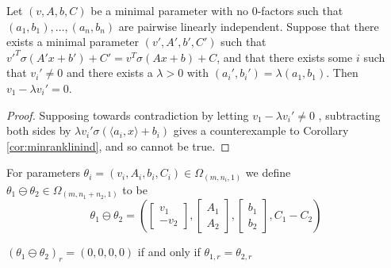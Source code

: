 \documentclass[11pt,letterpaper]{amsart}
\begin{document}
\begin{corollary}\label{cor:semidependenttermscancelling}
    Let $(v, A, b, C)$ be a minimal parameter with no 0-factors such that $(a_1, b_1), \ldots, (a_n, b_n)$ are pairwise linearly independent. Suppose that there exists a minimal parameter $(v', A', b', C')$ such that $v'^T\sigma (A' x + b')+C' = v^T\sigma (Ax + b) + C$, and that there exists some $i$ such that $v_i'\neq 0$ and there exists a $\lambda>0$ with $(a_i', b_i')=\lambda (a_1, b_1)$. Then $v_1-\lambda v_i'=0$. 
\end{corollary}
\begin{proof}
    Supposing towards contradiction by letting $v_1-\lambda v_i'\neq 0$ , subtracting both sides by $\lambda v_i'\sigma(\langle a_i, x\rangle + b_i)$ gives a counterexample to Corollary \ref{cor:minranklinind}, and so cannot be true.
\end{proof}
\begin{defin}
    For parameters $\theta_i=(v_i, A_i, b_i, C_i)\in \Omega_{(m, n_i, 1)}$ we define $\theta_1\ominus \theta_2\in \Omega_{(m, n_1+n_2, 1)}$ to be
    $$
    \theta_1\ominus \theta_2 = \left(\begin{bmatrix} v_1 \\ -v_2 \end{bmatrix}, \begin{bmatrix} A_1 \\ A_2 \end{bmatrix},\begin{bmatrix} b_1\\ b_2 \end{bmatrix}, C_1-C_2\right)
    $$
\end{defin}
\begin{lemma}\label{lem:0Hnrelation}
    $(\theta_1\ominus \theta_2)_r = (0, 0, 0, 0)$ if and only if $\theta_{1, r}=\theta_{2, r}$ 
\end{lemma}
\end{document}
